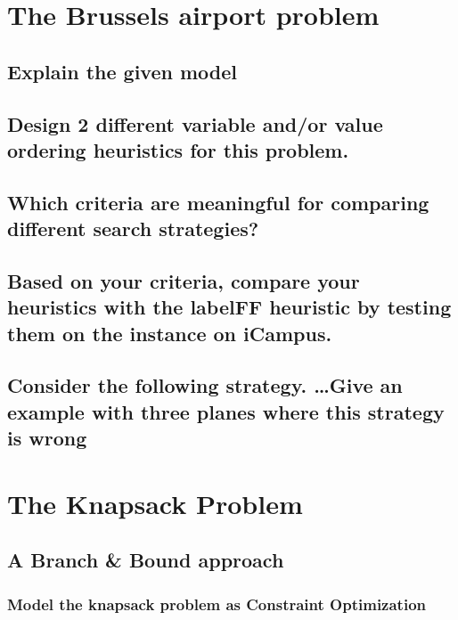 \documentclass[a4paper ,12pt,french]{article}
\begin{document}
\tableofcontents %

\thispagestyle{fancy}

\pagebreak
\setcounter{page}{1}
\pagestyle{fancy} %

\section{The Brussels airport problem}

\subsection{Explain the given model}
\subsection{Design 2 different variable and/or value ordering heuristics for this problem.}
\subsection{Which criteria are meaningful for comparing different search strategies?}
\subsection{Based on your criteria, compare your heuristics with the labelFF heuristic by testing them on the instance on iCampus.}
\subsection{Consider the following strategy. \dots Give an example with three planes where this strategy is wrong}

\section{The Knapsack Problem}

\subsection{A Branch \& Bound approach}

\subsubsection{Model the knapsack problem as Constraint Optimization}
\end{document}
